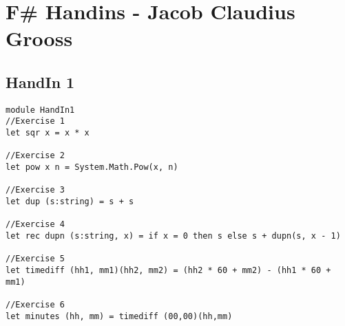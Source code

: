 \section{F\# Handins - Jacob Claudius Grooss}
\label{Appendix_FSharp_Grooss}

\subsection{HandIn 1}
\label{Appendix_FSharp_Grooss_1}
\begin{lstlisting}
module HandIn1
//Exercise 1
let sqr x = x * x

//Exercise 2
let pow x n = System.Math.Pow(x, n)

//Exercise 3
let dup (s:string) = s + s

//Exercise 4
let rec dupn (s:string, x) = if x = 0 then s else s + dupn(s, x - 1)

//Exercise 5
let timediff (hh1, mm1)(hh2, mm2) = (hh2 * 60 + mm2) - (hh1 * 60 + mm1)

//Exercise 6
let minutes (hh, mm) = timediff (00,00)(hh,mm)
\end{lstlisting}
